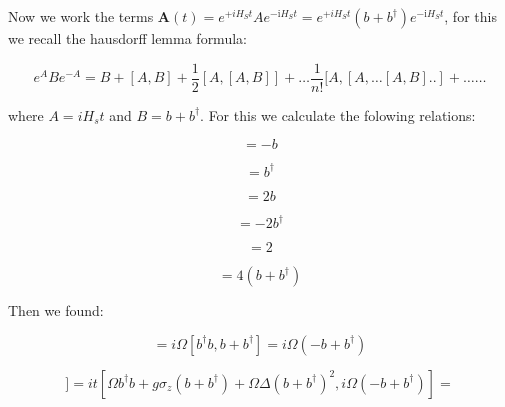 \documentclass[%
preprint,
onecolumn,
notitlepag,
 amsmath,amssymb,
 aps,
 pra,
]{revtex4-2}
\begin{document}


Now we work the terms $\boldsymbol{A}(t) = e^{+i H_{S} t} A e^{-\mathrm{i} H_{S} t} = e^{+i H_{S} t} (b+b^{\dagger}) e^{-\mathrm{i} H_{S} t} $, for this we recall the hausdorff lemma formula:


\begin{equation}
\left.e^{A} B e^{-A}=B+[A, B]+\frac{1}{2}[A,[A, B]]+\ldots \frac{1}{n !}[A,[A, \ldots[A, B] . .]+\ldots \ldots
\end{equation}

where $A= i H_s t $ and $B= b+b^{\dagger} $. For this we calculate the folowing relations: 

\begin{equation}
    [ b^{\dagger}b ,    b   ] = -b 
\end{equation}

\begin{equation}
    [ b^{\dagger}b ,    b ^{\dagger}  ] = b ^{\dagger} 
\end{equation}




\begin{equation}
    [ bb ,    b ^{\dagger}  ] = 2b 
\end{equation}


\begin{equation}
    [ b^{\dagger}b^{\dagger} ,    b  ] = -2b^{\dagger} 
\end{equation}

\begin{equation}
    [  b+ b^{\dagger}  ,  -b+ b^{\dagger}   ] = 2
\end{equation}

\begin{equation}
    [ \left( b+ b^{\dagger} \right)^2 , \left( -b+ b^{\dagger} \right)  ] = 4\left( b+ b^{\dagger} \right) 
\end{equation}


Then we found:

\begin{equation}
[A, B] = i \Omega [ b^{\dagger}b , b+b^{\dagger}  ] = i \Omega  \left( -b+b^{\dagger}  \right)  
\end{equation}

\begin{equation}
[A,[A, B]]= i  t [  \Omega b^{\dagger}b + g \sigma_z (b+b^{\dagger})  + \Omega \Delta \left( b+ b^{\dagger} \right)^2  , i \Omega  \left( -b+b^{\dagger}  \right)  ] = 
\end{equation}
\end{document}
